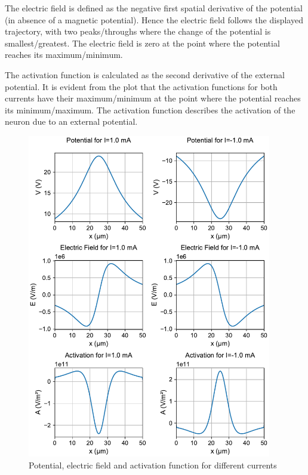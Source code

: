 \documentclass{scrartcl}
\begin{document}
The electric field is defined as the negative first spatial derivative of the potential (in absence of a magnetic potential). Hence the electric field follows the displayed trajectory, with two peaks/throughs where the change of the potential is smallest/greatest. The electric field is zero at the point where the potential reaches its maximum/minimum.

The activation function is calculated as the second derivative of the external potential. It is evident from the plot that the activation functions for both currents have their maximum/minimum at the point where the potential reaches its minimum/maximum. The activation function describes the activation of the neuron due to an external potential. 

\begin{figure}[h]
	\centering
	\includegraphics[width=0.95\textwidth]{figures/potential_and_derivatives}
	\caption{Potential, electric field and activation function for different currents}
	\label{fig:potential_and_derivatives}
\end{figure}
\end{document}
